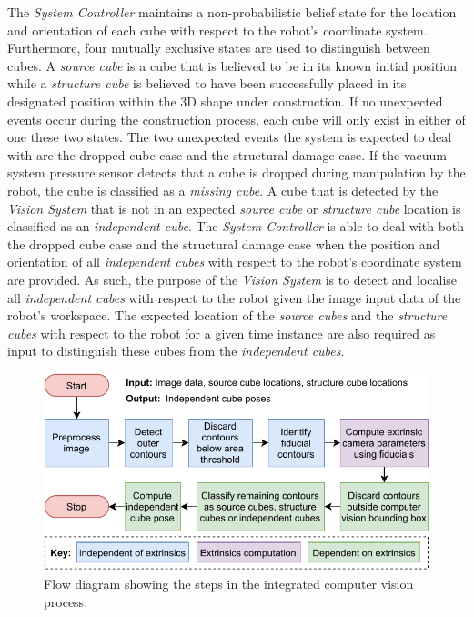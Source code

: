 The \textit{System Controller} maintains a non-probabilistic belief state for the location and orientation of each cube with respect to the robot's coordinate system. Furthermore, four mutually exclusive states are used to distinguish between cubes. A \textit{source cube} is a cube that is believed to be in its known initial position while a \textit{structure cube} is believed to have been successfully placed in its designated position within the 3D shape under construction. If no unexpected events occur during the construction process, each cube will only exist in either of one these two states. The two unexpected events the system is expected to deal with are the dropped cube case and the structural damage case. If the vacuum system pressure sensor detects that a cube is dropped during manipulation by the robot, the cube is classified as a \textit{missing cube}. A cube that is detected by the \textit{Vision System} that is not in an expected \textit{source cube} or \textit{structure cube} location is classified as an \textit{independent cube}. The \textit{System Controller} is able to deal with both the dropped cube case and the structural damage case when the position and orientation of all \textit{independent cubes} with respect to the robot's coordinate system are provided. As such, the purpose of the \textit{Vision System} is to detect and localise all \textit{independent cubes} with respect to the robot given the image input data of the robot's workspace. The expected location of the \textit{source cubes} and the \textit{structure cubes} with respect to the robot for a given time instance are also required as input to distinguish these cubes from the \textit{independent cubes}.


\begin{figure}[!ht]
	\centering
	\includegraphics[scale=1]{figures/high-level-computer-vision-design.pdf}
	\caption{Flow diagram showing the steps in the integrated computer vision process.}
	\label{fig:high-level-computer-vision-design}
\end{figure}

